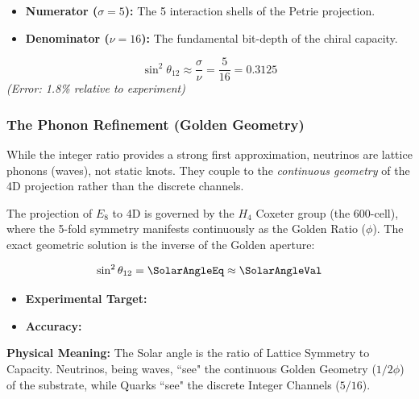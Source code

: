 \begin{itemize}
    \item \textbf{Numerator ($\sigma = 5$):} The 5 interaction shells of the Petrie projection.
    \item \textbf{Denominator ($\nu = 16$):} The fundamental bit-depth of the chiral capacity.
\end{itemize}

\begin{equation}
\sin^2 \theta_{12} \approx \frac{\sigma}{\nu} = \frac{5}{16} = \mathbf{0.3125}
\end{equation}
\textit{(Error: 1.8\% relative to experiment)}


\subsubsection{The Phonon Refinement (Golden Geometry)}
While the integer ratio provides a strong first approximation, neutrinos are lattice phonons (waves), not static knots. They couple to the \textit{continuous geometry} of the 4D projection rather than the discrete channels.

The projection of $E_8$ to 4D is governed by the $H_4$ Coxeter group (the 600-cell), where the 5-fold symmetry manifests continuously as the Golden Ratio ($\phi$). The exact geometric solution is the inverse of the Golden aperture:

\begin{equation}
\sin^2 \theta_{12} = \SolarAngleEq \approx \SolarAngleVal
\end{equation}

\begin{itemize}
    \item \textbf{Experimental Target:} \SolarAngleExp
    \item \textbf{Accuracy:} \SolarAngleAccText
\end{itemize}

\textbf{Physical Meaning:} The Solar angle is the ratio of Lattice Symmetry to Capacity. Neutrinos, being waves, ``see" the continuous Golden Geometry ($1/2\phi$) of the substrate, while Quarks ``see" the discrete Integer Channels ($5/16$).


